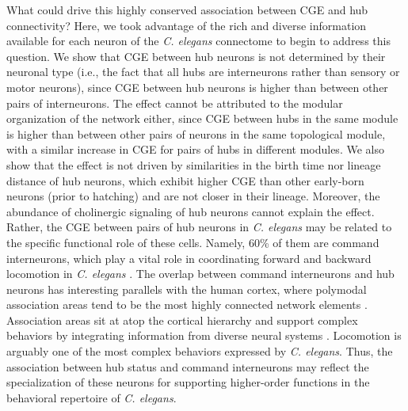 \documentclass[10pt,letterpaper]{article}
\begin{document}
{%
What could drive this highly conserved association between CGE and hub connectivity?
Here, we took advantage of the rich and diverse information available for each neuron of the \emph{C. elegans} connectome to begin to address this question.
We show that CGE between hub neurons \color{teal} is not determined \color{black} by their neuronal type (i.e., the fact that all hubs are interneurons rather than sensory or motor neurons), since CGE between hub neurons is higher than between other pairs of interneurons.
The effect cannot be attributed to the modular organization of the network either, since CGE between hubs in the same module is higher than between other pairs of neurons in the same topological module, with a similar increase in CGE for pairs of hubs in different modules.
We also show that the effect is not driven by similarities in the birth time nor lineage distance of hub neurons, which exhibit higher CGE than other early-born neurons (prior to hatching) and are not closer in their lineage.
Moreover, the abundance of cholinergic signaling of hub neurons cannot explain the effect.
Rather, the CGE between pairs of hub neurons in \textit{C. elegans} may be related to the specific functional role of these cells.
Namely, 60\% of them are command interneurons, which play a vital role in coordinating forward and backward locomotion in \textit{C. elegans} \cite{Kim:2016gl}.
The overlap between command interneurons and hub neurons has interesting parallels with the human cortex, where polymodal association areas tend to be the most highly connected network elements \cite{vandenHeuvel:2016eg}.
Association areas sit at atop the cortical hierarchy and support complex behaviors by integrating information from diverse neural systems \cite{Mesulam1998}.
Locomotion is arguably one of the most complex behaviors expressed by \emph{C. elegans}.
Thus, the association between hub status and command interneurons may reflect the specialization of these neurons for supporting higher-order functions in the behavioral repertoire of \emph{C. elegans}.

}
\end{document}
